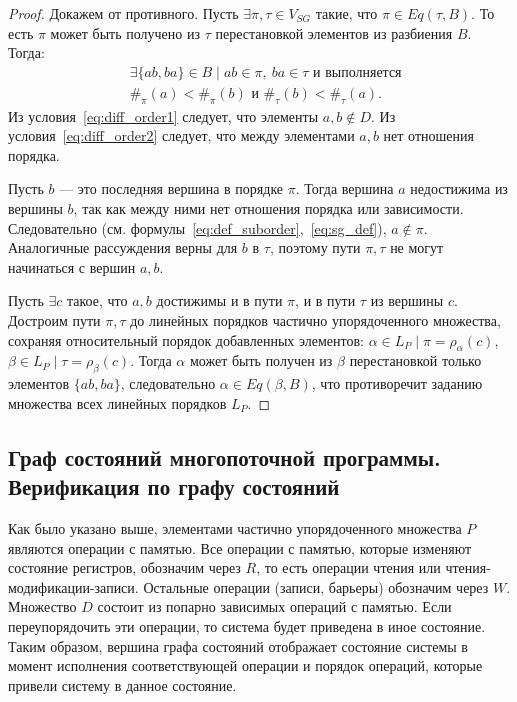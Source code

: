 \begin{proof}
  Докажем от противного. Пусть $\exists \pi,\tau \in V_{SG}$ такие,
  что $\pi \in Eq(\tau, B)$. То есть $\pi$ может быть получено из
  $\tau$ перестановкой элементов из разбиения $B$. Тогда:
  \begin{subequations}
    \begin{align}
      &\exists \{ab,ba\} \in B \mid ab \in \pi,\ ba \in \tau \text{ и
      выполняется} \label{eq:diff_order1} \\
      &\#_{\pi}(a) < \#_{\pi}(b) \text{ и } \#_{\tau}(b) <
      \#_{\tau}(a). \label{eq:diff_order2}
    \end{align}
    \label{eq:diff_order}
  \end{subequations}
  Из условия~\ref{eq:diff_order1} следует, что элементы $a,b \not \in
  D$. Из условия~\ref{eq:diff_order2} следует, что между элементами
  $a,b$ нет отношения порядка.

  Пусть $b$ — это последняя вершина в порядке $\pi$. Тогда вершина
  $a$ недостижима из вершины $b$, так как между ними нет отношения
  порядка или зависимости. Следовательно
  (см. формулы~\ref{eq:def_suborder},~\ref{eq:sg_def}), $a \not \in \pi$.
  Аналогичные рассуждения верны для $b$ в $\tau$, поэтому пути
  $\pi,\tau$ не могут начинаться с вершин $a, b$.

  Пусть $\exists c$ такое, что $a,b$ достижимы и в пути $\pi$, и в
  пути $\tau$ из вершины $c$. Достроим пути $\pi, \tau$ до линейных
  порядков частично упорядоченного множества, сохраняя относительный
  порядок добавленных элементов: $\alpha \in L_P \mid \pi =
  \rho_\alpha(c)$, $\beta \in L_P \mid \tau = \rho_\beta(c)$. Тогда
  $\alpha$ может быть получен из $\beta$ перестановкой только
  элементов $\{ab, ba\}$, следовательно $\alpha \in Eq(\beta, B)$,
  что противоречит заданию множества всех линейных порядков $L_P$.
\end{proof}

\subsection{Граф состояний многопоточной программы. Верификация по
графу состояний}
\label{sec:ch4/verif}

Как было указано выше, элементами частично упорядоченного множества
$P$ являются операции с памятью. Все операции с памятью, которые
изменяют состояние регистров, обозначим через $R$, то есть операции
чтения или чтения-модификации-записи. Остальные операции (записи,
барьеры) обозначим через $W$. Множество $D$ состоит из попарно
зависимых операций с памятью. Если переупорядочить эти операции, то
система будет приведена в иное состояние.
Таким образом, вершина графа состояний отображает состояние системы в
момент исполнения соответствующей операции и порядок операций,
которые привели систему в данное состояние.

